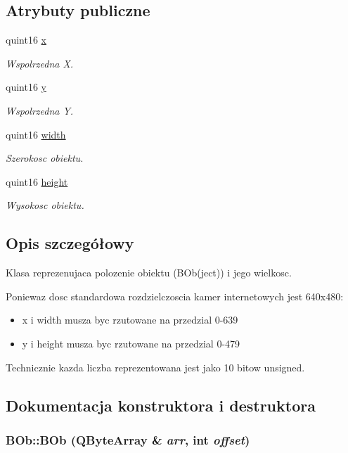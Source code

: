 \subsection*{Atrybuty publiczne}
\begin{CompactItemize}
\item 
quint16 \hyperlink{class_b_ob_5dcc6a3c2f4ffaf3d630187e853dd876}{x}
\begin{CompactList}\small\item\em Wspolrzedna X. \item\end{CompactList}\item 
quint16 \hyperlink{class_b_ob_da96bf49e446d3f9a5ce02f36e44c9b4}{y}
\begin{CompactList}\small\item\em Wspolrzedna Y. \item\end{CompactList}\item 
quint16 \hyperlink{class_b_ob_3e1652784396111952cd16a77a666a2b}{width}
\begin{CompactList}\small\item\em Szerokosc obiektu. \item\end{CompactList}\item 
quint16 \hyperlink{class_b_ob_c406681bc6029dc6e41aa53791e9f210}{height}
\begin{CompactList}\small\item\em Wysokosc obiektu. \item\end{CompactList}\end{CompactItemize}


\subsection{Opis szczegółowy}
Klasa reprezenujaca polozenie obiektu (BOb(ject)) i jego wielkosc. 

Poniewaz dosc standardowa rozdzielczoscia kamer internetowych jest 640x480:

\begin{itemize}
\item x i width musza byc rzutowane na przedzial 0-639 \item y i height musza byc rzutowane na przedzial 0-479\end{itemize}
Technicznie kazda liczba reprezentowana jest jako 10 bitow unsigned. 

\subsection{Dokumentacja konstruktora i destruktora}
\hypertarget{class_b_ob_b71739ff83cf58d15b42f26274c583d1}{
\subsubsection[{BOb}]{\setlength{\rightskip}{0pt plus 5cm}BOb::BOb (QByteArray \& {\em arr}, \/  int {\em offset})}}
\label{class_b_ob_b71739ff83cf58d15b42f26274c583d1}


